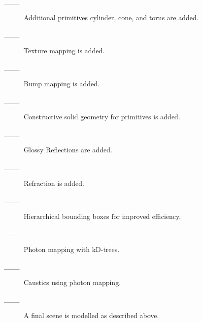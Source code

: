 \documentclass {article}
\begin{document}
\begin{description}
     \item[\_\_\_]  Additional primitives cylinder, cone, and torus are added.

     \item[\_\_\_]  Texture mapping is added.

     \item[\_\_\_]  Bump mapping is added.

     \item[\_\_\_]  Constructive solid geometry for primitives is added.

     \item[\_\_\_]  Glossy Reflections are added.

     \item[\_\_\_]  Refraction is added.

     \item[\_\_\_]  Hierarchical bounding boxes for improved efficiency.

     \item[\_\_\_]  Photon mapping with kD-trees.

     \item[\_\_\_]  Caustics using photon mapping.

     \item[\_\_\_]  A final scene is modelled as described above.
\end{description}
\end{document}
